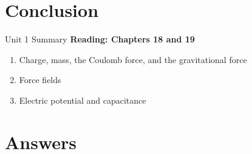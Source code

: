 \documentclass{beamer}
\begin{document}
\section{Conclusion}

\begin{frame}{Unit 1 Summary}
\textbf{Reading: Chapters 18 and 19}
\begin{enumerate}
\item Charge, mass, the Coulomb force, and the gravitational force
\item Force fields
\item Electric potential and capacitance
\end{enumerate}
\end{frame}

\section{Answers}
\end{document}
